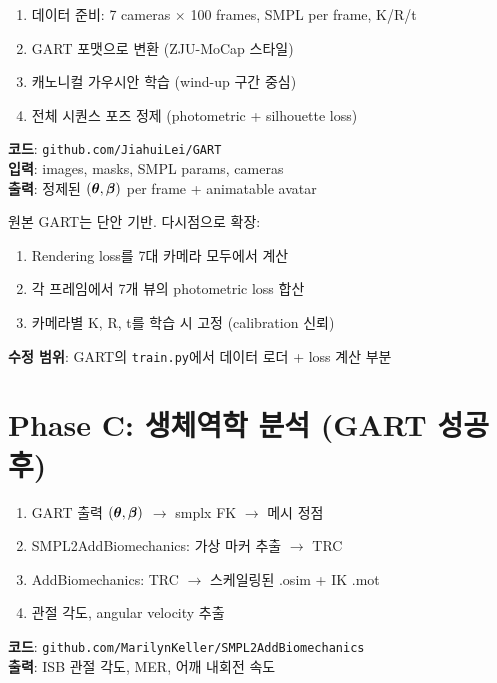 \documentclass[11pt, a4paper]{report}
\begin{document}
\begin{pipelinebox}[title={B1. GART 학습 (1순위, 1--2일)}]
\begin{enumerate}[leftmargin=*]
  \item 데이터 준비: 7 cameras $\times$ 100 frames, SMPL per frame, K/R/t
  \item GART 포맷으로 변환 (ZJU-MoCap 스타일)
  \item 캐노니컬 가우시안 학습 (wind-up 구간 중심)
  \item 전체 시퀀스 포즈 정제 (photometric + silhouette loss)
\end{enumerate}

\textbf{코드}: \texttt{github.com/JiahuiLei/GART}\\
\textbf{입력}: images, masks, SMPL params, cameras\\
\textbf{출력}: 정제된 $(\bm{\theta}, \bm{\beta})$ per frame + animatable avatar
\end{pipelinebox}

\begin{pipelinebox}[title={B2. 다시점 확장 (GART 수정)}]
원본 GART는 단안 기반. 다시점으로 확장:
\begin{enumerate}[leftmargin=*]
  \item Rendering loss를 7대 카메라 모두에서 계산
  \item 각 프레임에서 7개 뷰의 photometric loss 합산
  \item 카메라별 K, R, t를 학습 시 고정 (calibration 신뢰)
\end{enumerate}

\textbf{수정 범위}: GART의 \texttt{train.py}에서 데이터 로더 + loss 계산 부분
\end{pipelinebox}


\section{Phase C: 생체역학 분석 (GART 성공 후)}

\begin{pipelinebox}[title={C1. SMPL $\rightarrow$ OpenSim 연결 (3--5일)}]
\begin{enumerate}[leftmargin=*]
  \item GART 출력 $(\bm{\theta}, \bm{\beta})$ $\rightarrow$ smplx FK $\rightarrow$ 메시 정점
  \item SMPL2AddBiomechanics: 가상 마커 추출 $\rightarrow$ TRC
  \item AddBiomechanics: TRC $\rightarrow$ 스케일링된 .osim + IK .mot
  \item 관절 각도, angular velocity 추출
\end{enumerate}

\textbf{코드}: \texttt{github.com/MarilynKeller/SMPL2AddBiomechanics}\\
\textbf{출력}: ISB 관절 각도, MER, 어깨 내회전 속도
\end{pipelinebox}
\end{document}

